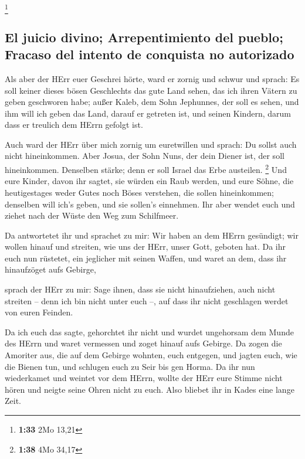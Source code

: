 \footnote{\textbf{1:33} 2Mo 13,21}

\hypertarget{el-juicio-divino-arrepentimiento-del-pueblo-fracaso-del-intento-de-conquista-no-autorizado}{%
\subsection{El juicio divino; Arrepentimiento del pueblo; Fracaso del
intento de conquista no
autorizado}\label{el-juicio-divino-arrepentimiento-del-pueblo-fracaso-del-intento-de-conquista-no-autorizado}}

 Als aber der HErr euer Geschrei hörte, ward er zornig
und schwur und sprach:  Es soll keiner dieses bösen
Geschlechts das gute Land sehen, das ich ihren Vätern zu geben
geschworen habe;  außer Kaleb, dem Sohn Jephunnes, der
soll es sehen, und ihm will ich geben das Land, darauf er getreten ist,
und seinen Kindern, darum dass er treulich dem HErrn gefolgt ist.

 Auch ward der HErr über mich zornig um euretwillen und
sprach: Du sollst auch nicht hineinkommen.  Aber Josua,
der Sohn Nuns, der dein Diener ist, der soll hineinkommen. Denselben
stärke; denn er soll Israel das Erbe austeilen. \footnote{\textbf{1:38}
  4Mo 34,17}  Und eure Kinder, davon ihr sagtet, sie
würden ein Raub werden, und eure Söhne, die heutigestages weder Gutes
noch Böses verstehen, die sollen hineinkommen; denselben will ich's
geben, und sie sollen's einnehmen.  Ihr aber wendet euch
und ziehet nach der Wüste den Weg zum Schilfmeer.

 Da antwortetet ihr und sprachet zu mir: Wir haben an dem
HErrn gesündigt; wir wollen hinauf und streiten, wie uns der HErr, unser
Gott, geboten hat. Da ihr euch nun rüstetet, ein jeglicher mit seinen
Waffen, und waret an dem, dass ihr hinaufzöget aufs Gebirge,

 sprach der HErr zu mir: Sage ihnen, dass sie nicht
hinaufziehen, auch nicht streiten -- denn ich bin nicht unter euch --,
auf dass ihr nicht geschlagen werdet von euren Feinden.

 Da ich euch das sagte, gehorchtet ihr nicht und wurdet
ungehorsam dem Munde des HErrn und waret vermessen und zoget hinauf aufs
Gebirge.  Da zogen die Amoriter aus, die auf dem Gebirge
wohnten, euch entgegen, und jagten euch, wie die Bienen tun, und
schlugen euch zu Seir bis gen Horma.  Da ihr nun
wiederkamet und weintet vor dem HErrn, wollte der HErr eure Stimme nicht
hören und neigte seine Ohren nicht zu euch.  Also bliebet
ihr in Kades eine lange Zeit.

